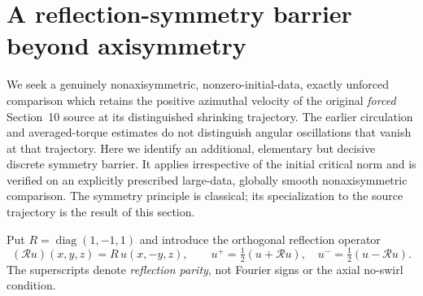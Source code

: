
\section{A reflection-symmetry barrier beyond axisymmetry}
\label{sec:xxxvi-reflection}

We seek a genuinely nonaxisymmetric, nonzero-initial-data,
exactly unforced comparison which retains the positive azimuthal
velocity of the original \emph{forced} Section~10 source
\cite{openai2026} at its distinguished shrinking trajectory.
The earlier circulation and averaged-torque estimates do not
distinguish angular oscillations that vanish at that trajectory.
Here we identify an additional, elementary but decisive discrete
symmetry barrier. It applies irrespective of the initial critical
norm and is verified on an explicitly prescribed large-data,
globally smooth nonaxisymmetric comparison. The symmetry principle
is classical; its specialization to the source trajectory is
the result of this section.

Put $R=\operatorname{diag}(1,-1,1)$ and introduce the
orthogonal reflection operator
\[
(\mathscr Ru)(x,y,z)=R\,u(x,-y,z),\qquad
u^{+}=\tfrac12(u+\mathscr Ru),\quad
u^{-}=\tfrac12(u-\mathscr Ru).
\]
The superscripts denote \emph{reflection parity}, not
Fourier signs or the axial no-swirl condition.

